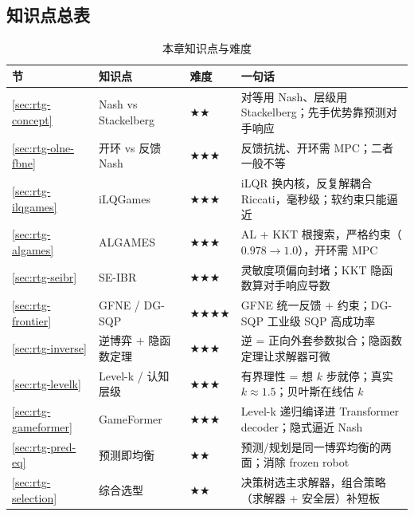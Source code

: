\subsection*{知识点总表}
\begin{table}[H]\centering\small
\caption{本章知识点与难度}
\label{tab:rtg-knowledge}
\begin{tabular}{p{} p{} p{} p{}}
\toprule
节 & 知识点 & 难度 & 一句话 \\
\midrule
\cref{sec:rtg-concept} & Nash vs Stackelberg & $\bigstar\bigstar$ & 对等用 Nash、层级用 Stackelberg；先手优势靠预测对手响应 \\
\cref{sec:rtg-olne-fbne} & 开环 vs 反馈 Nash & $\bigstar\bigstar\bigstar$ & 反馈抗扰、开环需 MPC；二者一般不等 \\
\cref{sec:rtg-ilqgames} & iLQGames & $\bigstar\bigstar\bigstar$ & iLQR 换内核，反复解耦合 Riccati，毫秒级；软约束只能逼近 \\
\cref{sec:rtg-algames} & ALGAMES & $\bigstar\bigstar\bigstar$ & AL + KKT 根搜索，严格约束（$0.978\to1.0$），开环需 MPC \\
\cref{sec:rtg-seibr} & SE-IBR & $\bigstar\bigstar\bigstar$ & 灵敏度项偏向封堵；KKT 隐函数算对手响应导数 \\
\cref{sec:rtg-frontier} & GFNE / DG-SQP & $\bigstar\bigstar\bigstar\bigstar$ & GFNE 统一反馈 + 约束；DG-SQP 工业级 SQP 高成功率 \\
\cref{sec:rtg-inverse} & 逆博弈 + 隐函数定理 & $\bigstar\bigstar\bigstar$ & 逆 = 正向外套参数拟合；隐函数定理让求解器可微 \\
\cref{sec:rtg-levelk} & Level-k / 认知层级 & $\bigstar\bigstar\bigstar$ & 有界理性 = 想 $k$ 步就停；真实 $k\approx1.5$；贝叶斯在线估 $k$ \\
\cref{sec:rtg-gameformer} & GameFormer & $\bigstar\bigstar\bigstar$ & Level-k 递归编译进 Transformer decoder；隐式逼近 Nash \\
\cref{sec:rtg-pred-eq} & 预测即均衡 & $\bigstar\bigstar$ & 预测/规划是同一博弈均衡的两面；消除 frozen robot \\
\cref{sec:rtg-selection} & 综合选型 & $\bigstar\bigstar$ & 决策树选主求解器，组合策略（求解器 + 安全层）补短板 \\
\bottomrule
\end{tabular}
\end{table}

